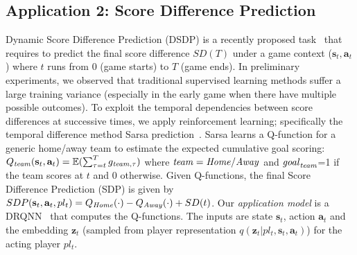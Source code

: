 \documentclass{article}
\newcommand{\expect}{\mathbb{E}}
\newcommand{\scorediff}{SD}
\newcommand{\latentvariables}{\mathbf{z}}
\newcommand{\inference}{q}
\newcommand{\state}{\mathbf{s}}
\newcommand{\action}{\mathbf{a}}
\newcommand{\goal}{g}
\newcommand{\player}{pl}
\newcommand{\home}{\it{Home}}
\newcommand{\away}{\it{Away}}
\newcommand{\team}{\it{team}}
\newcommand{\egoal}{\it{goal}}
\begin{document}
\subsection{Application 2: Score Difference Prediction}\label{subsec:score-diff}
Dynamic Score Difference Prediction (DSDP) is a recently proposed task~\cite{ganguly2018problem} that requires to predict the final score difference $\scorediff(T)$ under a game context ($\state_{t},\action_{t}$) where $t$ runs from 0 (game starts) to $T$ (game ends). 
In preliminary experiments, we observed that traditional supervised learning methods suffer a large training variance (especially in the early game when there have multiple possible outcomes).
To exploit the temporal dependencies between score differences at successive times, we apply reinforcement learning; specifically the temporal difference method Sarsa prediction~\cite{sutton2018reinforcement}. Sarsa learns a Q-function for a generic home/away team to estimate the expected cumulative goal scoring: $Q_{\team}(\state_{t},\action_{t})= \expect(\sum_{\tau=t}^{T}\goal_{\team,\tau})$ where $\team=\home/\away$ and $\egoal_{\team}$=1 if the team scores at $t$ and 0 otherwise. Given Q-functions, the final Score Difference Prediction (SDP) is given by %
    $SDP(\state_{t},\action_{t}, \player_{t})= Q_{\home}(\cdot)-Q_{\away}(\cdot) + \scorediff(t)$.
Our {\em application model} is a DRQNN~\cite{littlestone} that computes the Q-functions. The inputs are state $\state_{t}$, action $\action_{t}$ and the embedding $\latentvariables_{t}$ (sampled from player representation $\inference(\latentvariables_{t} |\player_{t} ,\state_{t},\action_{t})$) for the acting player $\player_{t}$. 
\end{document}
